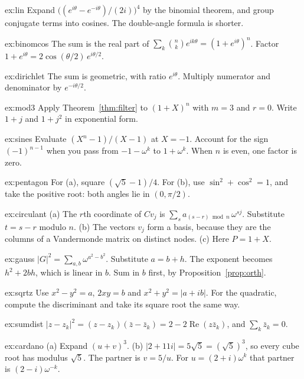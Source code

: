 \begin{hint}{ex:lin}
Expand $\bigl((e^{i\theta}-e^{-i\theta})/(2i)\bigr)^4$ by the binomial theorem, and group conjugate terms into cosines. The double-angle formula is shorter.
\end{hint}
\begin{hint}{ex:binomcos}
The sum is the real part of $\sum_k\binom nk e^{ik\theta}=(1+e^{i\theta})^n$. Factor $1+e^{i\theta}=2\cos(\theta/2)\,e^{i\theta/2}$.
\end{hint}
\begin{hint}{ex:dirichlet}
The sum is geometric, with ratio $e^{i\theta}$. Multiply numerator and denominator by $e^{-i\theta/2}$.
\end{hint}
\begin{hint}{ex:mod3}
Apply Theorem~\ref{thm:filter} to $(1+X)^n$ with $m=3$ and $r=0$. Write $1+j$ and $1+j^2$ in exponential form.
\end{hint}
\begin{hint}{ex:sines}
Evaluate $(X^n-1)/(X-1)$ at $X=-1$. Account for the sign $(-1)^{n-1}$ when you pass from $-1-\omega^k$ to $1+\omega^k$. When $n$ is even, one factor is zero.
\end{hint}
\begin{hint}{ex:pentagon}
For (a), square $(\sqrt5-1)/4$. For (b), use $\sin^2+\cos^2=1$, and take the positive root: both angles lie in $(0,\pi/2)$.
\end{hint}
\begin{hint}{ex:circulant}
(a) The $r$th coordinate of $Cv_j$ is $\sum_s a_{(s-r)\bmod n}\,\omega^{sj}$. Substitute $t=s-r$ modulo $n$. (b) The vectors $v_j$ form a basis, because they are the columns of a Vandermonde matrix on distinct nodes. (c) Here $P=1+X$.
\end{hint}
\begin{hint}{ex:gauss}
$|G|^2=\sum_{a,b}\omega^{a^2-b^2}$. Substitute $a=b+h$. The exponent becomes $h^2+2bh$, which is linear in $b$. Sum in $b$ first, by Proposition~\ref{prop:orth}.
\end{hint}
\begin{hint}{ex:sqrtz}
Use $x^2-y^2=a$, $2xy=b$ and $x^2+y^2=|a+ib|$. For the quadratic, compute the discriminant and take its square root the same way.
\end{hint}
\begin{hint}{ex:sumdist}
$|z-z_k|^2=(z-z_k)(\bar z-\bar z_k)=2-2\operatorname{Re}(z\bar z_k)$, and $\sum_k\bar z_k=0$.
\end{hint}
\begin{hint}{ex:cardano}
(a) Expand $(u+v)^3$. (b) $|2+11i|=5\sqrt5=(\sqrt5)^3$, so every cube root has modulus $\sqrt5$. The partner is $v=5/u$. For $u=(2+i)\omega^k$ that partner is $(2-i)\omega^{-k}$.
\end{hint}
